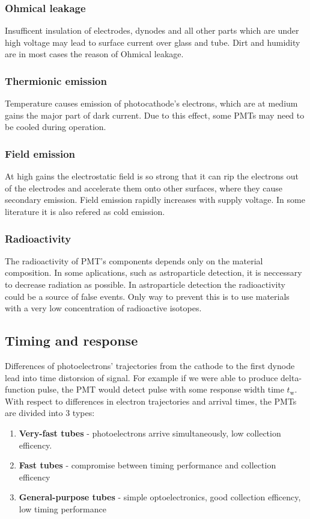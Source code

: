 \subsubsection{Ohmical leakage}
Insufficent insulation of electrodes, dynodes and all other parts which are under high voltage may lead to surface current over glass and tube. Dirt and humidity are in most cases the reason of Ohmical leakage.

\subsubsection{Thermionic emission}
Temperature causes emission of photocathode's electrons, which are at medium gains the major part of dark current.  Due to this effect, some PMTs may need to be cooled during operation.
\subsubsection{Field emission}
At high gains the electrostatic field is so strong that it can rip the electrons out of the electrodes and accelerate them onto other surfaces, where they cause secondary emission. Field emission rapidly increases with supply voltage. In some literature it is also refered as cold emission.
\subsubsection{Radioactivity}
The radioactivity of PMT's components depends only on the material composition. In some aplications, such as astroparticle detection, it is neccessary to decrease radiation as possible. In astroparticle detection the radioactivity could be a source of false events. Only way to prevent this is to use materials with a very low concentration of radioactive isotopes.

\subsection{Timing and response}
Differences of photoelectrons' trajectories from the cathode to the first dynode lead into time distorsion of signal. For example if we were able to produce delta-function pulse, the PMT would detect pulse with some response width time $t_\textrm{w}$.
With respect to differences in electron trajectories and arrival times, the PMTs are divided into 3 types:
\begin{enumerate}
\item \textbf{Very-fast tubes} - photoelectrons arrive simultaneously, low collection efficency.
\item \textbf{Fast tubes} - compromise between timing performance and collection efficency
\item \textbf{General-purpose tubes} - simple optoelectronics, good collection efficency, low timing performance
\end{enumerate}

